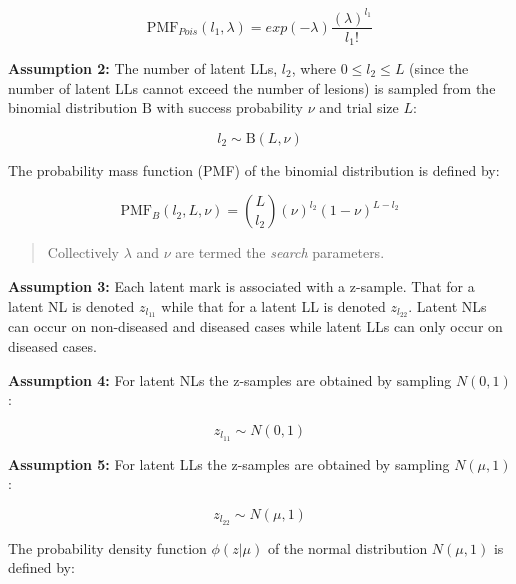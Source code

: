\documentclass[
]{book}
\begin{document}
\begin{equation} 
\text{PMF}_{Pois}\left ( l_1, \lambda \right ) = exp\left ( -\lambda \right ) \frac{{(\lambda)^{l_1}}}{l_1!}
\label{eq:rsm-poisson-PMF}
\end{equation}

\textbf{Assumption 2:} The number of latent LLs, \(l_2\), where \(0 \leq l_2 \leq L\) (since the number of latent LLs cannot exceed the number of lesions) is sampled from the binomial distribution \(\text{B}\) with success probability \(\nu\) and trial size \(L\):

\begin{equation} 
l_2 \sim \text{B}\left ( L, \nu \right ) 
\label{eq:rsm-binomial-sampling}
\end{equation}

The probability mass function (PMF) of the binomial distribution is defined by:

\begin{equation} 
\text{PMF}_{B}\left ( l_2, L, \nu \right ) = \binom{L}{l_2} \left (\nu  \right )^{l_2} \left (1-\nu  \right )^{L-l_2}
\label{eq:rsm-binomial-PMF}
\end{equation}

\begin{quote}
Collectively \(\lambda\) and \(\nu\) are termed the \emph{search} parameters.
\end{quote}

\textbf{Assumption 3:} Each latent mark is associated with a z-sample. That for a latent NL is denoted \(z_{l_11}\) while that for a latent LL is denoted \(z_{l_22}\). Latent NLs can occur on non-diseased and diseased cases while latent LLs can only occur on diseased cases.

\textbf{Assumption 4:} For latent NLs the z-samples are obtained by sampling \(N \left ( 0, 1 \right )\):

\begin{equation} 
z_{l_11} \sim N \left ( 0, 1 \right )
\label{eq:rsm-sampling-l1}
\end{equation}

\textbf{Assumption 5:} For latent LLs the z-samples are obtained by sampling \(N \left ( \mu, 1 \right )\):

\begin{equation} 
z_{l_22} \sim N \left ( \mu, 1 \right )
\label{eq:rsm-sampling-l2}
\end{equation}

The probability density function \(\phi\left ( z | \mu \right )\) of the normal distribution \(N \left ( \mu, 1 \right )\) is defined by:
\end{document}
